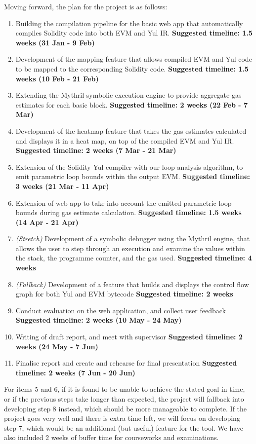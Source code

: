 Moving forward, the plan for the project is as follows:
\begin{enumerate}
  \item Building the compilation pipeline for the basic web app that automatically compiles Solidity code into both EVM and Yul IR. \textbf{Suggested timeline: 1.5 weeks (31 Jan - 9 Feb)}
  \item Development of the mapping feature that allows compiled EVM and Yul code to be mapped to the corresponding Solidity code. \textbf{Suggested timeline: 1.5 weeks (10 Feb - 21 Feb)}
  \item Extending the Mythril symbolic execution engine to provide aggregate gas estimates for each basic block. \textbf{Suggested timeline: 2 weeks (22 Feb - 7 Mar)}
  \item Development of the heatmap feature that takes the gas estimates calculated and displays it in a heat map, on top of the compiled EVM and Yul IR. \textbf{Suggested timeline: 2 weeks (7 Mar - 21 Mar)}
  \item Extension of the Solidity Yul compiler with our loop analysis algorithm, to emit parametric loop bounds within the output EVM. \textbf{Suggested timeline: 3 weeks (21 Mar - 11 Apr)}
  \item Extension of web app to take into account the emitted parametric loop bounds during gas estimate calculation. \textbf{Suggested timeline: 1.5 weeks (14 Apr - 21 Apr)}
  \item \textit{(Stretch)} Development of a symbolic debugger using the Mythril engine, that allows the user to step through an execution and examine the values within the stack, the programme counter, and the gas used. \textbf{Suggested timeline: 4 weeks}
  \item \textit{(Fallback)} Development of a feature that builds and displays the control flow graph for both Yul and EVM bytecode \textbf{Suggested timeline: 2 weeks}
  \item Conduct evaluation on the web application, and collect user feedback \textbf{Suggested timeline: 2 weeks (10 May - 24 May)}
  \item Writing of draft report, and meet with supervisor \textbf{Suggested timeline: 2 weeks (24 May - 7 Jun)}
  \item Finalise report and create and rehearse for final presentation \textbf{Suggested timeline: 2 weeks (7 Jun - 20 Jun)}
\end{enumerate}

For items 5 and 6, if it is found to be unable to achieve the stated goal in time, or if the previous
steps take longer than expected, the project will fallback into developing step 8 instead, which
should be more manageable to complete. If the project goes very well and there is extra time left,
we will focus on developing step 7, which would be an additional (but useful) feature for the tool.
We have also included 2 weeks of buffer time for courseworks and examinations.